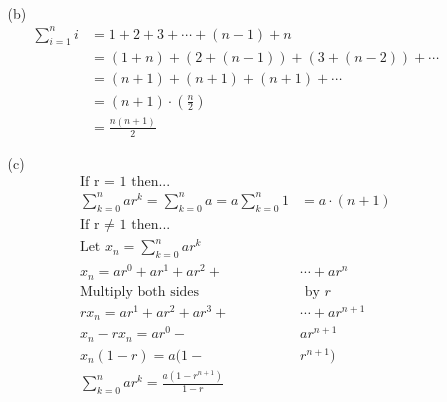 \documentclass[12pt]{article}
\begin{document}
\begin{enumerate}
\begin{enumerate}
\begin{align*}
                    \end{align*}
                \color{black}
                \item[(b)]
                \color{blue}
                    \begin{align*}
                        \sum_{i=1}^{n}i &= 1 + 2 + 3 + \cdots + (n-1) + n \\
                        &= (1 + n) + (2 + (n-1)) + (3 + (n-2)) + \cdots \\
                        &= (n + 1) + (n + 1) + (n + 1) + \cdots \\
                        &= (n + 1) \cdot \left(\frac{n}{2}\right) \\
                        &= \frac{n(n + 1)}{2}
                   \end{align*}
                \color{black}
                \item[(c)]
                \color{blue}
                   \begin{align*}
                        \text{If r = 1 then...} \\
                        \sum_{k=0}^{n}ar^k = \sum_{k=0}^{n}a = a\sum_{k=0}^{n}1 &= a \cdot (n + 1)\\
                        \text{If r $\ne$ 1 then...} \\
                        \text{Let $x_n = \sum_{k=0}^{n}ar^k$} \\
                        x_n = ar^0 + ar^1 + ar^2 + &\cdots + ar^n \\
                        \text{Multiply both sides}&\text{ by $r$}\\
                        rx_n = ar^1 + ar^2 + ar^3 + &\cdots + ar^{n+1} \\
                        x_n - rx_n = ar^0 - &ar^{n+1} \\
                        x_n(1-r) = a(1-&r^{n+1}) \\
                        \sum_{k=0}^{n}ar^k = \frac{a(1-r^{n+1})}{1-r}& \\ \\
                     \end{align*}
                \color{black}
            \end{enumerate}
    \end{enumerate}
    \newpage
\end{document}
